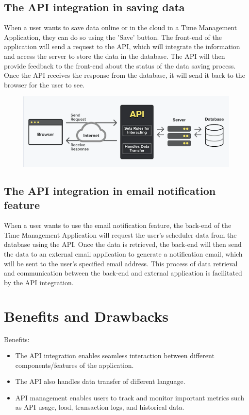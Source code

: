 \documentclass[peerreview]{IEEEtran}
\begin{document}
\subsection{The API integration in saving data}
When a user wants to save data online or in the cloud in a Time Management Application, they can do so using the 'Save' button. The front-end of the application will send a request to the API, which will integrate the information and access the server to store the data in the database. The API will then provide feedback to the front-end about the status of the data saving process. Once the API receives the response from the database, it will send it back to the browser for the user to see.
  \begin{figure}[!h]
  \centering
  \includegraphics[width=0.8\columnwidth]{./images/front-end to database.png} 
  \label{fig_sim}
  \end{figure}
\subsection{The API integration in email notification feature}
When a user wants to use the email notification feature, the back-end of the Time Management Application will request the user's scheduler data from the database using the API. Once the data is retrieved, the back-end will then send the data to an external email application to generate a notification email, which will be sent to the user's specified email address. This process of data retrieval and communication between the back-end and external application is facilitated by the API integration.

\section{Benefits and Drawbacks} \label{sec:criteria}
Benefits:
\begin{itemize}
  \item The API integration enables seamless interaction between different components/features of the application.
  \item The API also handles data transfer of different language.
  \item API management enables users to track and monitor important metrics such as API usage, load, transaction logs, and historical data. 
\end{itemize}
\end{document}
